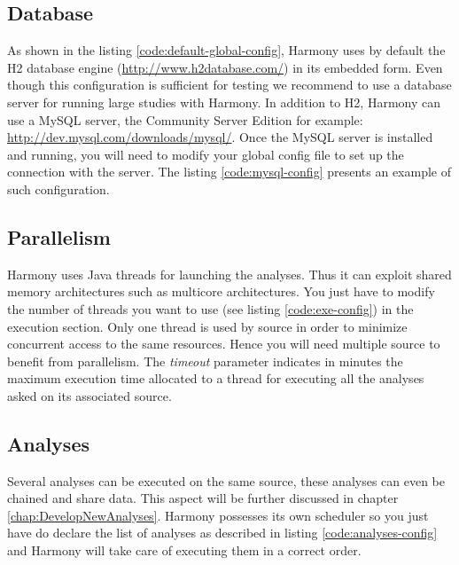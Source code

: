 		\subsection{Database}
		As shown in the listing \ref{code:default-global-config}, Harmony uses by default the H2 database engine (\url{http://www.h2database.com/}) in its embedded form. Even though this configuration is sufficient for testing we recommend to use a database server for running large studies with Harmony. In addition to H2, Harmony can use a MySQL server, the Community Server Edition for example: \url{http://dev.mysql.com/downloads/mysql/}. Once the MySQL server is installed and running, you will need to modify your global config file to set up the connection with the server. The listing \ref{code:mysql-config} presents an example of such configuration.
		
		
		\subsection{Parallelism}
		Harmony uses Java threads for launching the analyses. Thus it can exploit shared memory architectures such as multicore architectures. You just have to modify the number of threads you want to use (see listing \ref{code:exe-config}) in the execution section. Only one thread is used by source in order to minimize concurrent access to the same resources. Hence you will need multiple source to benefit from parallelism. The \emph{timeout} parameter indicates in minutes the maximum execution time allocated to a thread for executing all the analyses asked on its associated source. 
		

		\subsection{Analyses}
		Several analyses can be executed on the same source, these analyses can even be chained and share data. This aspect will be further discussed in chapter \ref{chap:DevelopNewAnalyses}. Harmony possesses its own scheduler so you just have do declare the list of analyses as described in listing \ref{code:analyses-config} and Harmony will take care of executing them in a correct order.
		
